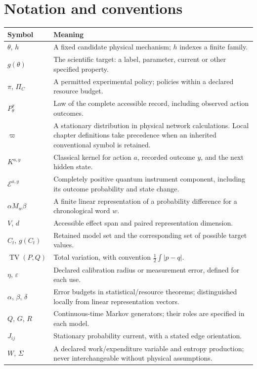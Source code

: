 \documentclass[11pt,oneside]{book}
\theoremstyle{definition}
\theoremstyle{remark}
\begin{document}
\chapter*{Notation and conventions}
\begin{longtable}{p{}p{}}
\toprule
Symbol & Meaning\\
\midrule
$\theta$, $h$ & A fixed candidate physical mechanism; $h$ indexes a finite family.\\
$g(\theta)$ & The scientific target: a label, parameter, current or other specified property.\\
$\pi$, $\Pi_C$ & A permitted experimental policy; policies within a declared resource budget.\\
$P_\theta^\pi$ & Law of the complete accessible record, including observed action outcomes.\\
$\varpi$ & A stationary distribution in physical network calculations. Local chapter definitions take precedence when an inherited conventional symbol is retained.\\
$K^{a,y}$ & Classical kernel for action $a$, recorded outcome $y$, and the next hidden state.\\
$\mathcal E^{a,y}$ & Completely positive quantum instrument component, including its outcome probability and state change.\\
$\alpha M_w\beta$ & A finite linear representation of a probability difference for a chronological word $w$.\\
$V$, $d$ & Accessible effect span and paired representation dimension.\\
$C_t$, $g(C_t)$ & Retained model set and the corresponding set of possible target values.\\
$\operatorname{TV}(P,Q)$ & Total variation, with convention $\frac12\int|p-q|$.\\
$\eta$, $\varepsilon$ & Declared calibration radius or measurement error, defined for each use.\\
$\alpha$, $\beta$, $\delta$ & Error budgets in statistical/resource theorems; distinguished locally from linear representation vectors.\\
$Q$, $G$, $R$ & Continuous-time Markov generators; their roles are specified in each model.\\
$J_{ij}$ & Stationary probability current, with a stated edge orientation.\\
$W$, $\Sigma$ & A declared work/expenditure variable and entropy production; never interchangeable without physical assumptions.\\
\bottomrule
\end{longtable}
\end{document}
